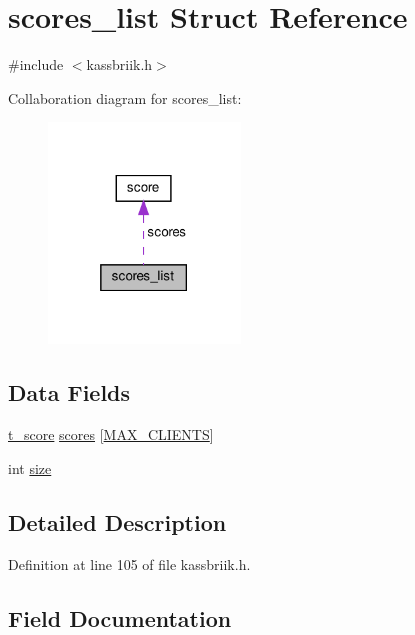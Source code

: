 \hypertarget{structscores__list}{}\section{scores\+\_\+list Struct Reference}
\label{structscores__list}


{\ttfamily \#include $<$kassbriik.\+h$>$}



Collaboration diagram for scores\+\_\+list\+:\nopagebreak
\begin{figure}[H]
\begin{center}
\leavevmode
\includegraphics[width=145pt]{structscores__list__coll__graph}
\end{center}
\end{figure}
\subsection*{Data Fields}
\begin{DoxyCompactItemize}
\item 
\hyperlink{structt__score}{t\+\_\+score} \hyperlink{structscores__list_a419b845c86c29189d87e70fd893a024d}{scores} \mbox{[}\hyperlink{kassbriik_8h_a0a8f91f93d75a07f0ae45077db45b3eb}{M\+A\+X\+\_\+\+C\+L\+I\+E\+N\+TS}\mbox{]}
\item 
int \hyperlink{structscores__list_a439227feff9d7f55384e8780cfc2eb82}{size}
\end{DoxyCompactItemize}


\subsection{Detailed Description}


Definition at line 105 of file kassbriik.\+h.



\subsection{Field Documentation}
\mbox{\label{structscores__list_a419b845c86c29189d87e70fd893a024d}} 
